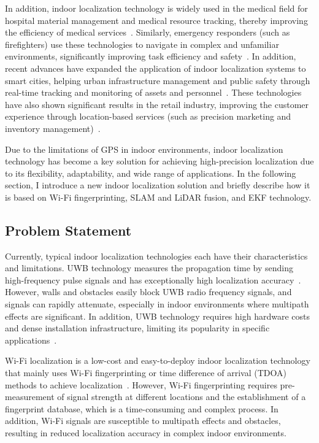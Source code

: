 \documentclass[12pt,a4paper]{article}
\numberwithin{equation}{section}
\begin{document}
In addition, indoor localization technology is widely used in the medical field
for hospital material management and medical resource tracking, thereby
improving the efficiency of medical services~\cite{HOSSAIN20151}. Similarly,
emergency responders (such as firefighters) use these technologies to navigate
in complex and unfamiliar environments, significantly improving task efficiency
and safety~\cite {fischer2010location}. In addition, recent advances have
expanded the application of indoor localization systems to smart cities, helping
urban infrastructure management and public safety through real-time tracking and
monitoring of assets and personnel~\cite{zhang2020smartcity}. These technologies
have also shown significant results in the retail industry, improving the
customer experience through location-based services (such as precision marketing
and inventory management)~\cite{chen2019indoor}.

Due to the limitations of GPS in indoor environments, indoor localization
technology has become a key solution for achieving high-precision localization
due to its flexibility, adaptability, and wide range of applications. In the
following section, I introduce a new indoor localization solution and briefly
describe how it is based on Wi-Fi fingerprinting, SLAM and LiDAR fusion, and EKF
technology.

\subsection{Problem Statement}
Currently, typical indoor localization technologies each have their
characteristics and limitations. UWB technology measures the propagation time by
sending high-frequency pulse signals and has exceptionally high localization
accuracy~\cite{fontana2004recent}. However, walls and obstacles easily block UWB
radio frequency signals, and signals can rapidly attenuate, especially in indoor
environments where multipath effects are significant. In addition, UWB
technology requires high hardware costs and dense installation infrastructure,
limiting its popularity in specific applications~\cite{farahsari2022survey}.

Wi-Fi localization is a low-cost and easy-to-deploy indoor localization
technology that mainly uses Wi-Fi fingerprinting or time difference of arrival
(TDOA) methods to achieve
localization~\cite{yiu2017wireless,gustafsson2003positioning}. However, Wi-Fi
fingerprinting requires pre-measurement of signal strength at different
locations and the establishment of a fingerprint database, which is a
time-consuming and complex process. In addition, Wi-Fi signals are susceptible
to multipath effects and obstacles, resulting in reduced localization accuracy
in complex indoor environments.
\end{document}
